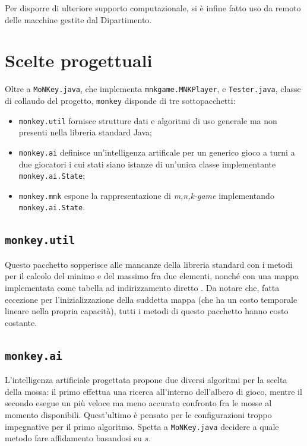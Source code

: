 \documentclass{article}
\begin{document}
Per disporre di ulteriore supporto computazionale, si è infine fatto uso da
remoto delle macchine gestite dal Dipartimento.

\section{Scelte progettuali}

Oltre a \verb!MoNKey.java!, che implementa \verb!mnkgame.MNKPlayer!, e
\verb!Tester.java!, classe di collaudo del progetto, \verb!monkey! disponde di
tre sottopacchetti:
\begin{itemize}
  \item \verb!monkey.util! fornisce strutture dati e algoritmi di uso generale
    ma non presenti nella libreria standard Java;
  \item \verb!monkey.ai! definisce un'intelligenza artificale per un generico
    gioco a turni a due giocatori i cui stati siano istanze di un'unica classe
    implementante \verb!monkey.ai.State!;
  \item \verb!monkey.mnk! espone la rappresentazione di \emph{m,n,k-game}
    implementando \verb!monkey.ai.State!.
\end{itemize}

\subsection{\texttt{monkey.util}}

\begin{sloppypar}
Questo pacchetto sopperisce alle mancanze della libreria standard con i metodi
per il calcolo del minimo e del massimo fra due elementi, nonché con una mappa
implementata come tabella ad indirizzamento diretto
\cite{at.UBO708344820100101}. Da notare che, fatta eccezione per
l'inizializzazione della suddetta mappa (che ha un costo temporale lineare nella
propria capacità), tutti i metodi di questo pacchetto hanno costo costante.
\end{sloppypar}

\subsection{\texttt{monkey.ai}}

L'intelligenza artificiale progettata propone due diversi algoritmi per la
scelta della mossa: il primo effettua una ricerca all'interno dell'albero di
gioco, mentre il secondo esegue un più veloce ma meno accurato confronto fra le
mosse al momento disponibili. Quest'ultimo è pensato per le configurazioni
troppo impegnative per il primo algoritmo. Spetta a \verb!MoNKey.java! decidere
a quale metodo fare affidamento basandosi su $s$.
\end{document}
